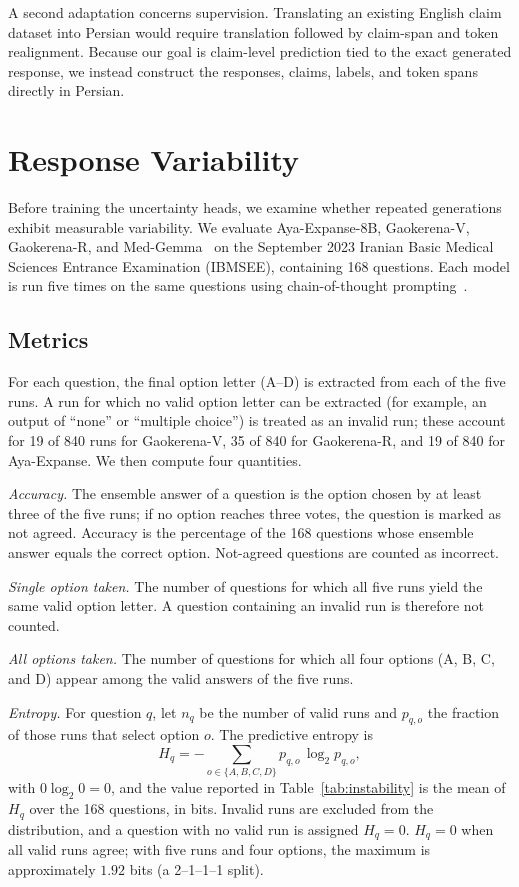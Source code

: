 \documentclass[conference]{IEEEtran}
\begin{document}
A second adaptation concerns supervision. Translating an existing English claim dataset into Persian would require translation followed by claim-span and token realignment. Because our goal is claim-level prediction tied to the exact generated response, we instead construct the responses, claims, labels, and token spans directly in Persian.

\section{Response Variability}

Before training the uncertainty heads, we examine whether repeated generations exhibit measurable variability. We evaluate Aya-Expanse-8B, Gaokerena-V, Gaokerena-R, and Med-Gemma~\cite{b16} on the September 2023 Iranian Basic Medical Sciences Entrance Examination (IBMSEE), containing 168 questions. Each model is run five times on the same questions using chain-of-thought prompting~\cite{b10}.

\subsection{Metrics}

For each question, the final option letter (A--D) is extracted from each of the five runs. A run for which no valid option letter can be extracted (for example, an output of ``none'' or ``multiple choice'') is treated as an invalid run; these account for 19 of 840 runs for Gaokerena-V, 35 of 840 for Gaokerena-R, and 19 of 840 for Aya-Expanse. We then compute four quantities.

\textit{Accuracy.} The ensemble answer of a question is the option chosen by at least three of the five runs; if no option reaches three votes, the question is marked as not agreed. Accuracy is the percentage of the 168 questions whose ensemble answer equals the correct option. Not-agreed questions are counted as incorrect.

\textit{Single option taken.} The number of questions for which all five runs yield the same valid option letter. A question containing an invalid run is therefore not counted.

\textit{All options taken.} The number of questions for which all four options (A, B, C, and D) appear among the valid answers of the five runs.

\textit{Entropy.} For question $q$, let $n_q$ be the number of valid runs and $p_{q,o}$ the fraction of those runs that select option $o$. The predictive entropy is
\begin{equation}
H_q = -\sum_{o\in\{A,B,C,D\}} p_{q,o}\,\log_2 p_{q,o},
\end{equation}
with $0\log_2 0 = 0$, and the value reported in Table~\ref{tab:instability} is the mean of $H_q$ over the 168 questions, in bits. Invalid runs are excluded from the distribution, and a question with no valid run is assigned $H_q=0$. $H_q=0$ when all valid runs agree; with five runs and four options, the maximum is approximately $1.92$ bits (a 2--1--1--1 split).
\end{document}
